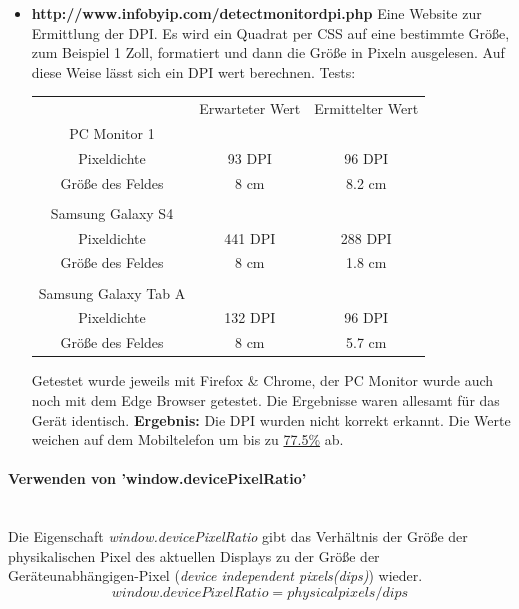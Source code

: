 \begin{itemize}
	\item
	      \textbf{http://www.infobyip.com/detectmonitordpi.php} Eine Website zur Ermittlung der DPI. Es wird ein Quadrat per CSS auf eine bestimmte Größe, zum Beispiel 1 Zoll, formatiert und dann die Größe in Pixeln ausgelesen. Auf diese Weise lässt sich ein DPI wert berechnen.
	      \newline
	      Tests:
	      \begin{tabular}{ccc}
	      	                     & Erwarteter Wert & Ermittelter Wert           \\
	      	PC Monitor 1         &                 &                            \\
	      	Pixeldichte          & 93 DPI          & \colorbox{red!30}{96 DPI}  \\
	      	Größe des Feldes     & 8 cm            & \colorbox{red!30}{8.2 cm}  \\
	      	                     &                 &                            \\
	      	Samsung Galaxy S4    &                 &                            \\
	      	Pixeldichte          & 441 DPI         & \colorbox{red!30}{288 DPI} \\
	      	Größe des Feldes     & 8 cm            & \colorbox{red!30}{1.8 cm}  \\
	      	                     &                 &                            \\
	      	Samsung Galaxy Tab A &                 &                            \\
	      	Pixeldichte          & 132 DPI         & \colorbox{red!30}{96 DPI}  \\
	      	Größe des Feldes     & 8 cm            & \colorbox{red!30}{5.7 cm}  \\
	      \end{tabular}
	      Getestet wurde jeweils mit Firefox \& Chrome, der PC Monitor wurde auch noch mit dem Edge Browser getestet. Die Ergebnisse waren allesamt für das Gerät identisch.
	      \newline
	      \textbf{Ergebnis:} Die DPI wurden nicht korrekt erkannt. Die Werte weichen auf dem Mobiltelefon um bis zu \underline{77.5\%} ab.
\end{itemize}
\newpage
\paragraph{Verwenden von 'window.devicePixelRatio'}
\mbox{}\\
Die Eigenschaft \textit{window.devicePixelRatio} gibt das Verhältnis der Größe der physikalischen Pixel des aktuellen Displays zu der Größe der Geräteunabhängigen-Pixel (\textit{device independent pixels(dips)}) wieder.
\begin{displaymath}
	window.devicePixelRatio = physical pixels / dips 
\end{displaymath}

